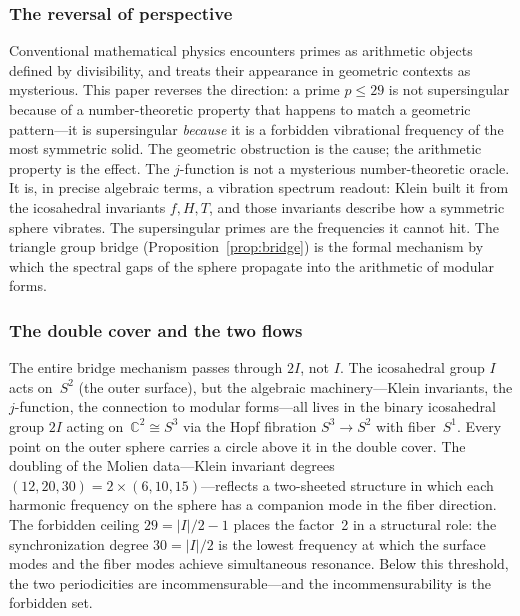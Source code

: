 \documentclass[11pt,letterpaper]{article}
\theoremstyle{definition}
\newcommand{\abs}[1]{\lvert #1 \rvert}
\begin{document}
\subsubsection*{The reversal of perspective}
Conventional mathematical physics encounters primes as arithmetic objects defined by divisibility, and treats their appearance in geometric contexts as mysterious.  This paper reverses the direction: a prime $p\le29$ is not supersingular because of a number-theoretic property that happens to match a geometric pattern---it is supersingular \emph{because} it is a forbidden vibrational frequency of the most symmetric solid.  The geometric obstruction is the cause; the arithmetic property is the effect.
The $j$-function is not a mysterious number-theoretic oracle.  It is, in precise algebraic terms, a vibration spectrum readout: Klein built it from the icosahedral invariants $f,H,T$, and those invariants describe how a symmetric sphere vibrates.  The supersingular primes are the frequencies it cannot hit.  The triangle group bridge (Proposition~\ref{prop:bridge}) is the formal mechanism by which the spectral gaps of the sphere propagate into the arithmetic of modular forms.
\subsubsection*{The double cover and the two flows}
The entire bridge mechanism passes through $2I$, not $I$.  The icosahedral group $I$ acts on~$S^2$ (the outer surface), but the algebraic machinery---Klein invariants, the $j$-function, the connection to modular forms---all lives in the binary icosahedral group $2I$ acting on~$\mathbb{C}^2\cong S^3$ via the Hopf fibration $S^3\to S^2$ with fiber~$S^1$.
Every point on the outer sphere carries a circle above it in the double cover.  The doubling of the Molien data---Klein invariant degrees $(12,20,30) = 2\times(6,10,15)$---reflects a two-sheeted structure in which each harmonic frequency on the sphere has a companion mode in the fiber direction.  The forbidden ceiling $29 = \abs{I}/2 - 1$ places the factor~2 in a structural role: the synchronization degree $30 = \abs{I}/2$ is the lowest frequency at which the surface modes and the fiber modes achieve simultaneous resonance.  Below this threshold, the two periodicities are incommensurable---and the incommensurability is the forbidden set.
\end{document}
